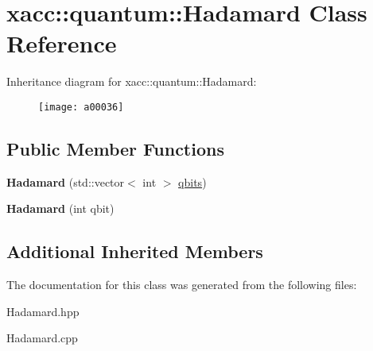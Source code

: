 \hypertarget{a00036}{}\section{xacc\+:\+:quantum\+:\+:Hadamard Class Reference}
\label{a00036}
Inheritance diagram for xacc\+:\+:quantum\+:\+:Hadamard\+:\begin{figure}[H]
\begin{center}
\leavevmode
\texttt{[image: a00036]}
\end{center}
\end{figure}
\subsection*{Public Member Functions}
\begin{DoxyCompactItemize}
\item 
{\bfseries Hadamard} (std\+::vector$<$ int $>$ \hyperlink{a00033_a2a56be6c2519ea65df4d06f4abae1393}{qbits})\hypertarget{a00036_a1f26925eeb4a52ca7e52dd9158fe7005}{}\label{a00036_a1f26925eeb4a52ca7e52dd9158fe7005}

\item 
{\bfseries Hadamard} (int qbit)\hypertarget{a00036_aac4e06aae35583bcce39b6b178948364}{}\label{a00036_aac4e06aae35583bcce39b6b178948364}

\end{DoxyCompactItemize}
\subsection*{Additional Inherited Members}


The documentation for this class was generated from the following files\+:\begin{DoxyCompactItemize}
\item 
Hadamard.\+hpp\item 
Hadamard.\+cpp\end{DoxyCompactItemize}
